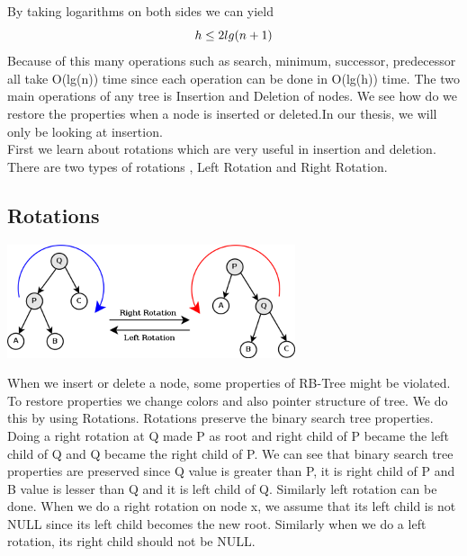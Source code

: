 \documentclass[BTech]{iitmdiss}
\begin{document}
By taking logarithms on both sides we can yield\\
\begin{equation}
        h \le 2lg(n+1)\\
\end{equation}
Because of this many operations such as search, minimum, successor, predecessor all take O(lg(n)) time since each operation can be done in O(lg(h)) time. The two main operations of any tree is Insertion and Deletion of nodes. We see how do we restore the properties when a node is inserted or deleted.In our thesis, we will only be looking at insertion.\\
First we learn about rotations which are very useful in insertion and deletion. There are two types of rotations , Left Rotation and Right Rotation.
\subsection{Rotations}
\centerline{\includegraphics{treap-rotation.png}}
When we insert or delete a node, some properties of RB-Tree might be violated. To restore properties we change colors and also pointer structure of tree. We do this by using Rotations. Rotations preserve the binary search tree properties.\\
Doing a right rotation at Q made P as root and right child of P became the left child of Q and Q became the right child of P. We can see that binary search tree properties are preserved since Q value is greater than P, it is right child of P and B value is lesser than Q and it is left child of Q. Similarly left rotation can be done. When we do a right rotation on node x, we assume that its left child is not NULL since its left child becomes the new root. Similarly when we do a left rotation, its right child should not be NULL.
\end{document}
